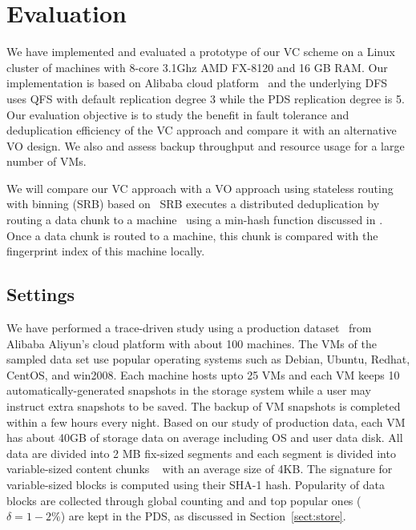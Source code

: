 \section{Evaluation}
\label{sect:evaluation}
We have implemented and evaluated a prototype of our VC scheme on a Linux cluster of machines with
8-core 3.1Ghz AMD FX-8120 and 16 GB RAM. 
Our implementation is based on Alibaba cloud platform~\cite{Aliyun,WeiZhangIEEE}
and the underlying DFS uses  QFS with default replication degree 3 while the PDS replication degree is 5.
Our evaluation objective is to
study the benefit in fault tolerance and   deduplication efficiency of the VC approach and compare it
with an alternative VO design. We also and assess backup throughput and  resource usage for a large number of VMs.

We will compare our VC approach with
a VO approach  using stateless routing with binning (SRB) 
based on~\cite{Dong2011,extreme_binning09}
SRB executes a distributed deduplication by routing a data chunk to a machine~\cite{Dong2011}
using  a min-hash function discussed in \cite{extreme_binning09}. Once a data chunk is routed to
a machine, this chunk is compared with the fingerprint index of this machine locally. 

\subsection{Settings}
We have performed a trace-driven study using a production dataset~\cite{WeiZhangIEEE} from 
Alibaba Aliyun's cloud platform with about 100 machines. 
The VMs  of the sampled  data set   use popular operating systems such as 
Debian, Ubuntu, Redhat, CentOS, and win2008. 
Each machine hosts upto 25 VMs and each VM keeps 10 automatically-generated snapshots in the storage system while
a user may instruct extra snapshots to be saved.
The backup of VM snapshots is completed within a few  hours every night.
Based on our study of production  data,  each VM has about  40GB of storage  data  on average
including OS and user data disk.
All data are divided into 2 MB fix-sized segments and each segment is divided into 
variable-sized content chunks ~\cite{similar94,rabin81} with an average size of 4KB.
The signature for variable-sized blocks is computed using their SHA-1 hash. 
Popularity of data blocks are collected through global counting and 
and top popular ones ($\delta=1-2\%$)  are  kept in the PDS, as discussed in Section~\ref{sect:store}.

